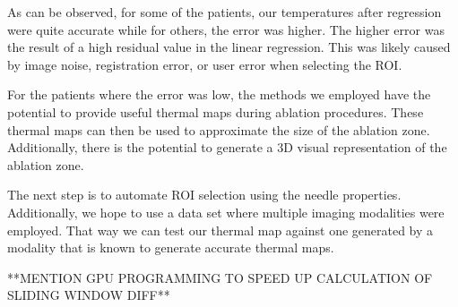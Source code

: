 \documentclass[]{spie}  %
\begin{document}
As can be observed, for some of the patients, our temperatures after regression were quite accurate while for others, the error was higher. The higher error was the result of a high residual value in the linear regression. This was likely caused by image noise, registration error, or user error when selecting the ROI. 

For the patients where the error was low, the methods we employed have the potential to provide useful thermal maps during ablation procedures. These thermal maps can then be used to approximate the size of the ablation zone. Additionally, there is the potential to generate a 3D visual representation of the ablation zone. 

The next step is to automate ROI selection using the needle properties. Additionally, we hope to use a data set where multiple imaging modalities were employed. That way we can test our thermal map against one generated by a modality that is known to generate accurate thermal maps. 

**MENTION GPU PROGRAMMING TO SPEED UP CALCULATION OF SLIDING WINDOW DIFF**



\end{document}
